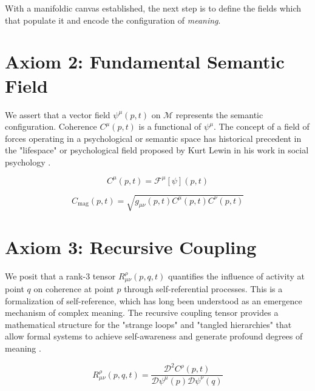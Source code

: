 With a manifoldic canvas established, the next step is to define the fields which that populate it and encode the configuration of \textit{meaning}.


\section{Axiom 2: Fundamental Semantic Field}
\label{1.2:axiom_2_fundamental_semantic_field}

We assert that a vector field \(\psi^\mu(p,t)\) on \(\mathcal{M}\) represents the semantic configuration. Coherence \(C^\mu(p,t)\) is a functional of \(\psi^\mu\). The concept of a field of forces operating in a psychological or semantic space has historical precedent in the "lifespace" or psychological field proposed by Kurt Lewin in his work in social psychology \autocite{Lewin1951}.

\begin{equation}
C^\mu(p,t) = \mathcal{F}^\mu[\psi](p,t)
\end{equation}

\begin{equation}
C_{\text{mag}}(p,t) = \sqrt{g_{\mu\nu}(p,t) C^\mu(p,t) C^\nu(p,t)}
\end{equation}


\section{Axiom 3: Recursive Coupling}
\label{1.3:axiom_3_recursive_coupling}

We posit that a rank-3 tensor \(R^\rho_{\mu\nu}(p,q,t)\) quantifies the influence of activity at point \(q\) on coherence at point \(p\) through self-referential processes. This is a formalization of self-reference, which has long been understood as an emergence mechanism of complex meaning. The recursive coupling tensor provides a mathematical structure for the "strange loops" and "tangled hierarchies" that allow formal systems to achieve self-awareness and generate profound degrees of meaning \autocite{Hofstadter1979}.

\begin{equation}
R^\rho_{\mu\nu}(p,q,t) = \frac{\mathcal{D}^2 C^\rho(p,t)}{\mathcal{D} \psi^\mu(p) \mathcal{D} \psi^\nu(q)}
\end{equation}

